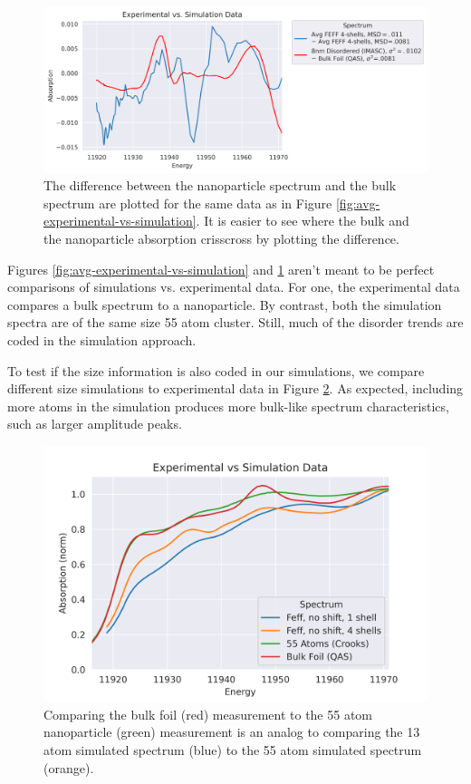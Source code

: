 \begin{figure}[h!]
	\centering
	\includegraphics[width=\linewidth]{Chapters/Figures/experimental_vs_simulation_delta.png}
	\caption[Bulk-nanoparticle difference: Simulation vs. Experimental data]{The difference between the nanoparticle spectrum and the bulk spectrum are plotted for the same data as in Figure \ref{fig:avg-experimental-vs-simulation}. It is easier to see where the bulk and the nanoparticle absorption crisscross by plotting the difference.}
	\label{fig:avg-experimential-vs-simulation-difference}
\end{figure}

Figures \ref{fig:avg-experimental-vs-simulation} and \ref{fig:avg-experimential-vs-simulation-difference} aren't meant to be perfect comparisons of simulations vs. experimental data. For one, the experimental data compares a bulk spectrum to a nanoparticle. By contrast, both the simulation spectra are of the same size 55 atom cluster. Still, much of the disorder trends are coded in the simulation approach. 

To test if the size information is also coded in our simulations, we compare different size simulations to experimental data in Figure \ref{fig:avg-experimental-vs-simulation2}. As expected, including more atoms in the simulation produces more bulk-like spectrum characteristics, such as larger amplitude peaks.

\begin{figure}[h]
	\centering
	\includegraphics[width=.7\linewidth]{Chapters/Figures/Bulk_55atom_experimental_theory_comparison.png}
	\caption[Simulation vs. Experimental 2]{Comparing the bulk foil (red) measurement to the 55 atom nanoparticle (green) measurement is an analog to comparing the 13 atom simulated spectrum (blue) to the 55 atom simulated spectrum (orange).}
	\label{fig:avg-experimental-vs-simulation2}
\end{figure}

